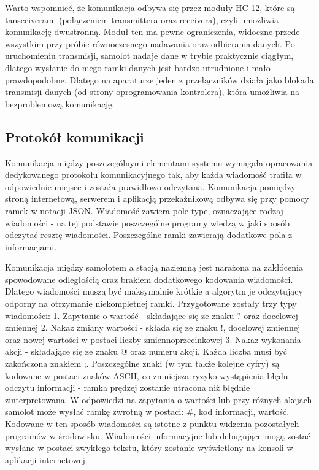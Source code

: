 \documentclass[12pt, a4paper]{article}
\begin{document}
Warto wspomnieć, że komunikacja odbywa się przez moduły HC-12, które są tansceiverami (połączeniem transmittera oraz receivera), czyli umożliwia komunikację dwustronną. Moduł ten ma pewne ograniczenia, widoczne przede wszystkim przy próbie równoczesnego nadawania oraz odbierania danych. Po uruchomieniu transmisji, samolot nadaje dane w trybie praktycznie ciągłym, dlatego wysłanie do niego ramki danych jest bardzo utrudnione i mało prawdopodobne. Dlatego na aparaturze jeden z przełączników działa jako blokada transmisji danych (od strony oprogramowania kontrolera), która umożliwia na bezproblemową komunikację.

\FloatBarrier
\subsection{Protokół komunikacji}
Komunikacja między poszczególnymi elementami systemu wymagała opracowania dedykowanego protokołu komunikacyjnego tak, aby każda wiadomość trafiła w odpowiednie miejsce i została prawidłowo odczytana. 
Komunikacja pomiędzy stroną internetową, serwerem i aplikacją przekaźnikową odbywa się przy pomocy ramek w notacji JSON. Wiadomość zawiera pole type, oznaczające rodzaj wiadomości - na tej podstawie poszczególne programy wiedzą w jaki sposób odczytać resztę wiadomości. Poszczególne ramki zawierają dodatkowe pola z informacjami. 

Komunikacja między samolotem a stacją naziemną jest narażona na zakłócenia spowodowane odległością oraz brakiem dodatkowego kodowania wiadomości. Dlatego wiadomości muszą być maksymalnie krótkie a algorytm je odczytujący odporny na otrzymanie niekompletnej ramki. Przygotowane zostały trzy typy wiadomości:
1.	Zapytanie o wartość - składające się ze znaku ? oraz docelowej zmiennej
2.	Nakaz zmiany wartości - składa się ze znaku !, docelowej zmiennej oraz nowej wartości w postaci liczby zmiennoprzecinkowej
3.	Nakaz wykonania akcji - składające się ze znaku @ oraz numeru akcji.
Każda liczba musi być zakończona znakiem ;. Poszczególne znaki (w tym także kolejne cyfry) są kodowane w postaci znaków ASCII, co zmniejsza ryzyko wystąpienia błędu odczytu informacji - ramka prędzej zostanie utracona niż błędnie zinterpretowana. W odpowiedzi na zapytania o wartości lub przy różnych akcjach samolot może wysłać ramkę zwrotną w postaci: \#, kod informacji, wartość. Kodowane w ten sposób wiadomości są istotne z punktu widzenia pozostałych programów w środowisku. Wiadomości informacyjne lub debugujące mogą zostać wysłane w postaci zwykłego tekstu, który zostanie wyświetlony na konsoli w aplikacji internetowej. 
\end{document}
